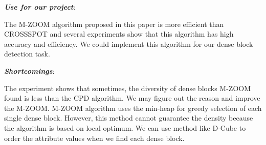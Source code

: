 \begin{itemize*}
\item {\em \textbf{Use for our project}}:

The M-ZOOM algorithm proposed in this paper is more efficient than CROSSSPOT and several experiments show that this algorithm has high accuracy and efficiency. We could implement this algorithm for our dense block detection task. \\ 


\item {\em \textbf{Shortcomings}}:

The experiment shows that sometimes, the diversity of dense blocks M-ZOOM found is less than the CPD algorithm. We may figure out the reason and improve the M-ZOOM. M-ZOOM algorithm uses the min-heap for greedy selection of each single dense block. However, this method cannot guarantee the density because the algorithm is based on local optimum. We can use method like D-Cube to order the attribute values when we find each dense block.

\end{itemize*}


